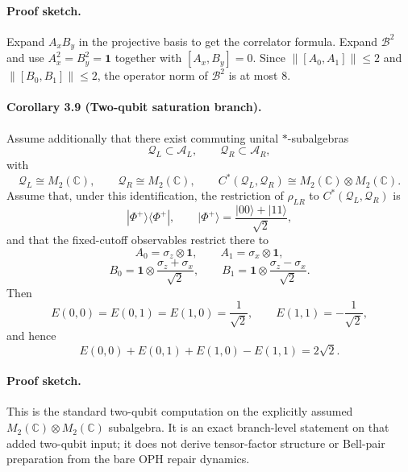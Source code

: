 \paragraph{\textbf{Proof sketch.}}
Expand \(A_xB_y\) in the projective basis to get the correlator formula. Expand \(\mathcal B^2\)
and use \(A_x^2=B_y^2=\mathbf 1\) together with \([A_x,B_y]=0\). Since
\(\|[A_0,A_1]\|\le 2\) and \(\|[B_0,B_1]\|\le 2\), the operator norm of \(\mathcal B^2\) is at
most \(8\).

\paragraph{\textbf{Corollary 3.9 (Two-qubit saturation branch).}}
Assume additionally that there exist commuting unital \(*\)-subalgebras
\[
\mathcal Q_L\subset \mathcal A_L,
\qquad
\mathcal Q_R\subset \mathcal A_R,
\]
with
\[
\mathcal Q_L\cong M_2(\mathbb C),
\qquad
\mathcal Q_R\cong M_2(\mathbb C),
\qquad
C^*(\mathcal Q_L,\mathcal Q_R)\cong M_2(\mathbb C)\otimes M_2(\mathbb C).
\]
Assume that, under this identification, the restriction of \(\rho_{LR}\) to
\(C^*(\mathcal Q_L,\mathcal Q_R)\) is
\[
|\Phi^+\rangle\!\langle\Phi^+|,
\qquad
|\Phi^+\rangle=\frac{|00\rangle+|11\rangle}{\sqrt2},
\]
and that the fixed-cutoff observables restrict there to
\[
A_0=\sigma_z\otimes \mathbf 1,
\qquad
A_1=\sigma_x\otimes \mathbf 1,
\]
\[
B_0=\mathbf 1\otimes \frac{\sigma_z+\sigma_x}{\sqrt2},
\qquad
B_1=\mathbf 1\otimes \frac{\sigma_z-\sigma_x}{\sqrt2}.
\]
Then
\[
E(0,0)=E(0,1)=E(1,0)=\frac{1}{\sqrt2},
\qquad
E(1,1)=-\frac{1}{\sqrt2},
\]
and hence
\[
E(0,0)+E(0,1)+E(1,0)-E(1,1)=2\sqrt2.
\]

\paragraph{\textbf{Proof sketch.}}
This is the standard two-qubit computation on the explicitly assumed
\(M_2(\mathbb C)\otimes M_2(\mathbb C)\) subalgebra. It is an exact branch-level statement
on that added two-qubit input; it does not derive tensor-factor structure or Bell-pair
preparation from the bare OPH repair dynamics.
